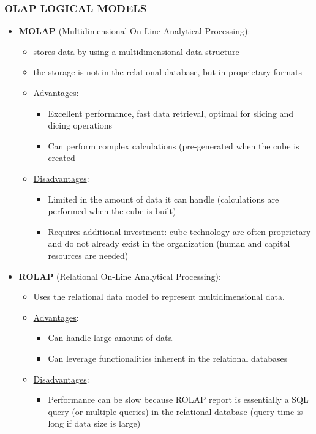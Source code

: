\documentclass[10pt,a4paper]{article}
\begin{document}
\subsubsection{OLAP LOGICAL MODELS}
\begin{itemize}
	\item \textbf{MOLAP} (Multidimensional On-Line Analytical Processing): 
	\begin{itemize}
		\item stores data by using a multidimensional data structure
		\item the storage is not in the relational database, but in proprietary formats
		\item \uline{Advantages}:
		\begin{itemize}
			\item Excellent performance, fast data retrieval, optimal for slicing and dicing operations
			\item Can perform complex calculations (pre-generated when the cube is created
		\end{itemize}
		\item \uline{Disadvantages}:
		\begin{itemize}
			\item Limited in the amount of data it can handle (calculations are performed when the cube is built)
			\item Requires additional investment: cube technology are often proprietary and do not already exist in the organization (human and capital resources are needed)
		\end{itemize}
	\end{itemize}		
	\item \textbf{ROLAP} (Relational On-Line Analytical Processing):
	\begin{itemize}
		\item Uses the relational data model to represent multidimensional data.
		\item \uline{Advantages}:
		\begin{itemize}
			\item Can handle large amount of data
			\item Can leverage functionalities inherent in the relational databases
		\end{itemize}
		\item \uline{Disadvantages}:
		\begin{itemize}
			\item Performance can be slow because ROLAP report is essentially a SQL query (or multiple queries) in the relational database (query time is long if data size is large)

\end{itemize}
\end{itemize}
\end{itemize}
\end{document}
